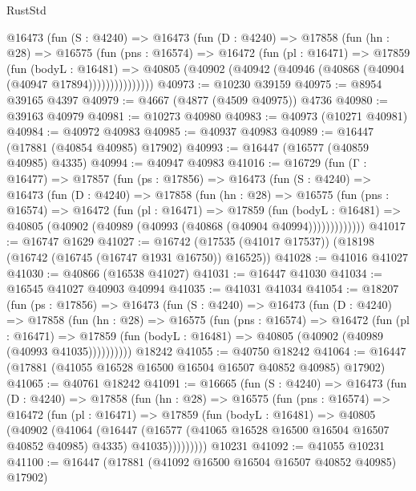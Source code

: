\begin{lexlean}{RustStd}
\begin{coremodule}
{\begin{coremodule}
{{{{{{{{{{{{{{{{{{{{{{{{{{{{{{{{{{{{{{{{{{{{{{{{{{{{{{{        @16473
          (fun (S : @4240) =>
          @16473
            (fun (D : @4240) =>
            @17858
              (fun (hn : @28) =>
              @16575
                (fun (pns : @16574) =>
                @16472
                  (fun (pl : @16471) =>
                  @17859
                    (fun (bodyL : @16481) =>
                    @40805 (@40902 (@40942 (@40946 (@40868 (@40904 (@40947 @17894)))))))))))))))
@40973 := @10230 @39159
@40975 := @8954 @39165 @4397
@40979 := @4667 (@4877 (@4509 @40975)) @4736
@40980 := @39163 @40979
@40981 := @10273 @40980
@40983 := @40973 (@10271 @40981)
@40984 := @40972 @40983
@40985 := @40937 @40983
@40989 := @16447 (@17881 (@40854 @40985) @17902)
@40993 := @16447 (@16577 (@40859 @40985) @4335)
@40994 := @40947 @40983
@41016 := @16729
    (fun (Γ : @16477) =>
    @17857
      (fun (ps : @17856) =>
      @16473
        (fun (S : @4240) =>
        @16473
          (fun (D : @4240) =>
          @17858
            (fun (hn : @28) =>
            @16575
              (fun (pns : @16574) =>
              @16472
                (fun (pl : @16471) =>
                @17859
                  (fun (bodyL : @16481) =>
                  @40805 (@40902 (@40989 (@40993 (@40868 (@40904 @40994)))))))))))))
@41017 := @16747 @1629
@41027 := @16742 (@17535 (@41017 @17537)) (@18198 (@16742 (@16745 (@16747 @1931 @16750)) @16525))
@41028 := @41016 @41027
@41030 := @40866 (@16538 @41027)
@41031 := @16447 @41030
@41034 := @16545 @41027 @40903 @40994
@41035 := @41031 @41034
@41054 := @18207
    (fun (ps : @17856) =>
    @16473
      (fun (S : @4240) =>
      @16473
        (fun (D : @4240) =>
        @17858
          (fun (hn : @28) =>
          @16575
            (fun (pns : @16574) =>
            @16472
              (fun (pl : @16471) =>
              @17859 (fun (bodyL : @16481) => @40805 (@40902 (@40989 (@40993 @41035))))))))))
    @18242
@41055 := @40750 @18242
@41064 := @16447 (@17881 (@41055 @16528 @16500 @16504 @16507 @40852 @40985) @17902)
@41065 := @40761 @18242
@41091 := @16665
    (fun (S : @4240) =>
    @16473
      (fun (D : @4240) =>
      @17858
        (fun (hn : @28) =>
        @16575
          (fun (pns : @16574) =>
          @16472
            (fun (pl : @16471) =>
            @17859
              (fun (bodyL : @16481) =>
              @40805
                (@40902
                  (@41064
                    (@16447
                      (@16577 (@41065 @16528 @16500 @16504 @16507 @40852 @40985) @4335)
                      @41035)))))))))
    @10231
@41092 := @41055 @10231
@41100 := @16447 (@17881 (@41092 @16500 @16504 @16507 @40852 @40985) @17902)
}}}}}}}}}}}}}}}}}}}}}}}}}}}}}}}}}}}}}}}}}}}}}}}}}}}}}}}
\end{coremodule}}
\end{coremodule}
\end{lexlean}

